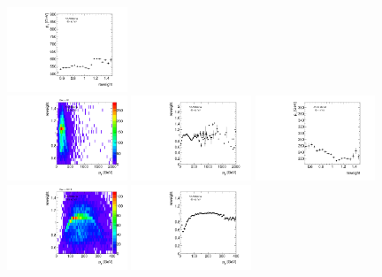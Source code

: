 \begin{figure}[htbp!]
\begin{center}
\includegraphics[width=0.32\textwidth,angle=-90]{figures/boosted/AppendixReweight/Weights/3Trk_Sideband_leadHCand_Pt_m_weight_profy.pdf}\\
\includegraphics[width=0.32\textwidth,angle=-90]{figures/boosted/AppendixReweight/Weights/3Trk_Sideband_leadHCand_trk0_Pt_weight.pdf}
\includegraphics[width=0.32\textwidth,angle=-90]{figures/boosted/AppendixReweight/Weights/3Trk_Sideband_leadHCand_trk0_Pt_weight_profx.pdf}
\includegraphics[width=0.32\textwidth,angle=-90]{figures/boosted/AppendixReweight/Weights/3Trk_Sideband_leadHCand_trk0_Pt_weight_profy.pdf}\\
\includegraphics[width=0.32\textwidth,angle=-90]{figures/boosted/AppendixReweight/Weights/3Trk_Sideband_sublHCand_trk0_Pt_weight.pdf}
\includegraphics[width=0.32\textwidth,angle=-90]{figures/boosted/AppendixReweight/Weights/3Trk_Sideband_sublHCand_trk0_Pt_weight_profx.pdf}

\end{center}
\end{figure}
